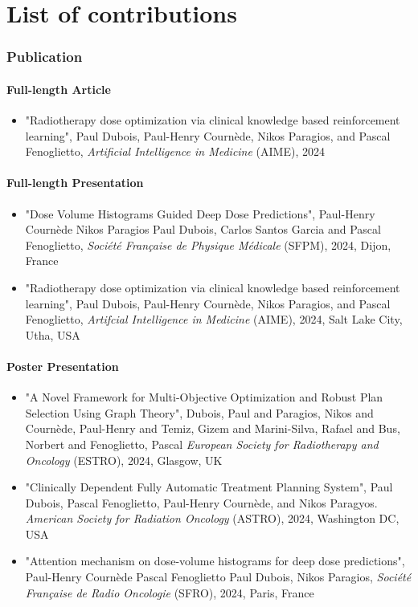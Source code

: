 \chapter*{List of contributions}
\subsection*{Publication}
\subsubsection*{Full-length Article}
\begin{itemize}
	\item "Radiotherapy dose optimization via clinical knowledge based reinforcement learning",
	Paul Dubois, Paul-Henry Cournède, Nikos Paragios, and Pascal Fenoglietto,
	\textit{Artificial Intelligence in Medicine} (AIME), 2024
\end{itemize}

\subsubsection*{Full-length Presentation}
\begin{itemize}
	\item "Dose Volume Histograms Guided Deep Dose Predictions",
	Paul-Henry Cournède Nikos Paragios Paul Dubois, Carlos Santos Garcia and Pascal Fenoglietto,
	\textit{Société Française de Physique Médicale} (SFPM), 2024, Dijon, France
	
	\item "Radiotherapy dose optimization via clinical knowledge based reinforcement learning",
	Paul Dubois, Paul-Henry Cournède, Nikos Paragios, and Pascal Fenoglietto,
	\textit{Artifcial Intelligence in Medicine} (AIME), 2024, Salt Lake City, Utha, USA
\end{itemize}

\subsubsection*{Poster Presentation}
\begin{itemize}
	\item "A Novel Framework for Multi-Objective Optimization and Robust Plan Selection Using Graph Theory",
	Dubois, Paul and Paragios, Nikos and Cournède, Paul-Henry and Temiz, Gizem and Marini-Silva, Rafael and Bus, Norbert and Fenoglietto, Pascal
	\textit{European Society for Radiotherapy and Oncology} (ESTRO), 2024, Glasgow, UK
	
	\item "Clinically Dependent Fully Automatic Treatment Planning System",
	Paul Dubois, Pascal Fenoglietto, Paul-Henry Cournède, and Nikos Paragyos.
	\textit{American Society for Radiation Oncology} (ASTRO), 2024, Washington DC, USA
	
	\item "Attention mechanism on dose-volume histograms for deep dose predictions",
	Paul-Henry Cournède Pascal Fenoglietto Paul Dubois, Nikos Paragios,
	\textit{Société Française de Radio Oncologie} (SFRO), 2024, Paris, France
\end{itemize}

